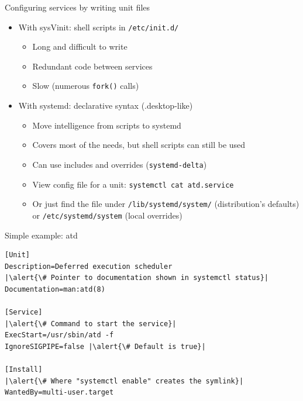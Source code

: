 \documentclass[11pt,final,usepdftitle=false]{beamer}
\begin{document}
\begin{frame}{Configuring services by writing unit files}
\begin{itemize}
\item With sysVinit: shell scripts in \texttt{/etc/init.d/}
\begin{itemize}
\item Long and difficult to write
	\hbr
\item Redundant code between services
	\hbr
\item Slow (numerous \texttt{fork()} calls)
\end{itemize}
\hbr
\item \alert{With systemd: declarative syntax} (.desktop-like)
\begin{itemize}
\item Move intelligence from scripts to systemd
	\hbr
\item Covers most of the needs, but shell scripts can still be used
	\hbr
\item Can use includes and overrides (\texttt{systemd-delta})
	\hbr
\item View config file for a unit: \texttt{systemctl cat atd.service}
	\hbr
\item Or just find the file under \texttt{/lib/systemd/system/} (distribution's defaults) or \texttt{/etc/systemd/system} (local overrides)
\end{itemize}
\end{itemize}
\end{frame}

\begin{frame}[fragile]{Simple example: atd}
\begin{lstlisting}[basicstyle=\ttfamily\normalsize,escapeinside={||}]
[Unit]
Description=Deferred execution scheduler
|\alert{\# Pointer to documentation shown in systemctl status}|
Documentation=man:atd(8)

[Service]
|\alert{\# Command to start the service}|
ExecStart=/usr/sbin/atd -f
IgnoreSIGPIPE=false |\alert{\# Default is true}|

[Install]
|\alert{\# Where "systemctl enable" creates the symlink}|
WantedBy=multi-user.target
\end{lstlisting}
\end{frame}
\end{document}
